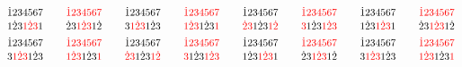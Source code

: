 \[ \SeqCompare{\dot{1}234567}{1\dot{2}3\textcolor{red}{1}\textcolor{red}{\dot{2}}\textcolor{red}{3}1}
\qquad
\SeqCompare{\textcolor{red}{\dot{1}}\textcolor{red}{2}\textcolor{red}{3}\textcolor{red}{4}\textcolor{red}{5}\textcolor{red}{6}\textcolor{red}{7}}{\dot{2}3\textcolor{red}{1}\textcolor{red}{\dot{2}}\textcolor{red}{3}1\dot{2}}
\qquad
\SeqCompare{\dot{1}234567}{3\textcolor{red}{1}\textcolor{red}{\dot{2}}\textcolor{red}{3}1\dot{2}3}
\qquad
\SeqCompare{\textcolor{red}{\dot{1}}\textcolor{red}{2}\textcolor{red}{3}\textcolor{red}{4}\textcolor{red}{5}\textcolor{red}{6}\textcolor{red}{7}}{\textcolor{red}{1}\textcolor{red}{\dot{2}}\textcolor{red}{3}1\dot{2}3\textcolor{red}{1}}
\qquad
\SeqCompare{\dot{1}234567}{\textcolor{red}{\dot{2}}\textcolor{red}{3}1\dot{2}3\textcolor{red}{1}\textcolor{red}{\dot{2}}}
\qquad
\SeqCompare{\textcolor{red}{\dot{1}}\textcolor{red}{2}\textcolor{red}{3}\textcolor{red}{4}\textcolor{red}{5}\textcolor{red}{6}\textcolor{red}{7}}{\textcolor{red}{3}1\dot{2}3\textcolor{red}{1}\textcolor{red}{\dot{2}}\textcolor{red}{3}}
\qquad
\SeqCompare{\dot{1}234567}{1\dot{2}3\textcolor{red}{1}\textcolor{red}{\dot{2}}\textcolor{red}{3}1}
\qquad
\SeqCompare{\textcolor{red}{\dot{1}}\textcolor{red}{2}\textcolor{red}{3}\textcolor{red}{4}\textcolor{red}{5}\textcolor{red}{6}\textcolor{red}{7}}{\dot{2}3\textcolor{red}{1}\textcolor{red}{\dot{2}}\textcolor{red}{3}1\dot{2}} \]
\[ \SeqCompare{\dot{1}234567}{3\textcolor{red}{1}\textcolor{red}{\dot{2}}\textcolor{red}{3}1\dot{2}3}
\qquad
\SeqCompare{\textcolor{red}{\dot{1}}\textcolor{red}{2}\textcolor{red}{3}\textcolor{red}{4}\textcolor{red}{5}\textcolor{red}{6}\textcolor{red}{7}}{\textcolor{red}{1}\textcolor{red}{\dot{2}}\textcolor{red}{3}1\dot{2}3\textcolor{red}{1}}
\qquad
\SeqCompare{\dot{1}234567}{\textcolor{red}{\dot{2}}\textcolor{red}{3}1\dot{2}3\textcolor{red}{1}\textcolor{red}{\dot{2}}}
\qquad
\SeqCompare{\textcolor{red}{\dot{1}}\textcolor{red}{2}\textcolor{red}{3}\textcolor{red}{4}\textcolor{red}{5}\textcolor{red}{6}\textcolor{red}{7}}{\textcolor{red}{3}1\dot{2}3\textcolor{red}{1}\textcolor{red}{\dot{2}}\textcolor{red}{3}}
\qquad
\SeqCompare{\dot{1}234567}{1\dot{2}3\textcolor{red}{1}\textcolor{red}{\dot{2}}\textcolor{red}{3}1}
\qquad
\SeqCompare{\textcolor{red}{\dot{1}}\textcolor{red}{2}\textcolor{red}{3}\textcolor{red}{4}\textcolor{red}{5}\textcolor{red}{6}\textcolor{red}{7}}{\dot{2}3\textcolor{red}{1}\textcolor{red}{\dot{2}}\textcolor{red}{3}1\dot{2}}
\qquad
\SeqCompare{\dot{1}234567}{3\textcolor{red}{1}\textcolor{red}{\dot{2}}\textcolor{red}{3}1\dot{2}3}
\qquad
\SeqCompare{\textcolor{red}{\dot{1}}\textcolor{red}{2}\textcolor{red}{3}\textcolor{red}{4}\textcolor{red}{5}\textcolor{red}{6}\textcolor{red}{7}}{\textcolor{red}{1}\textcolor{red}{\dot{2}}\textcolor{red}{3}1\dot{2}3\textcolor{red}{1}} \]
